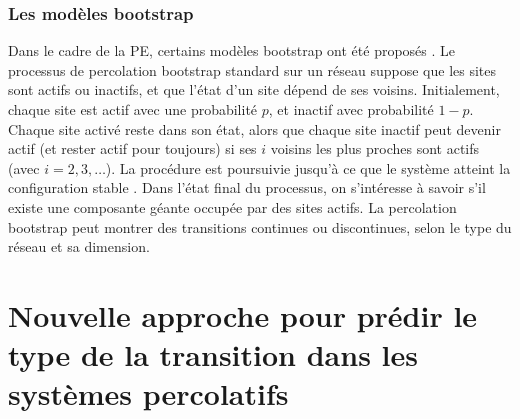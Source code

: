 \subsubsection{Les modèles bootstrap}
Dans le cadre de la PE, certains modèles bootstrap ont été proposés \cite{Baxter-al2010}. Le processus de percolation bootstrap standard sur un réseau suppose que les sites sont actifs ou inactifs, et que l'état d'un site dépend de ses voisins. Initialement, chaque site est actif avec une probabilité $p$, et inactif avec probabilité $1-p$. Chaque site activé reste dans son état, alors que chaque site inactif peut devenir actif (et rester actif pour toujours) si ses $i$ voisins les plus proches sont actifs (avec $i=2,3,\ldots$). La procédure est poursuivie jusqu'à ce que le système atteint la configuration stable . Dans l'état final du processus, on s'intéresse à savoir s'il existe  une composante géante occupée par des sites actifs. La percolation bootstrap peut montrer des transitions continues ou discontinues, selon le type du réseau et sa dimension.
\begin{sloppypar}
	
	\section{Nouvelle approche pour prédir le type de la transition dans les systèmes percolatifs}
\end{sloppypar}
